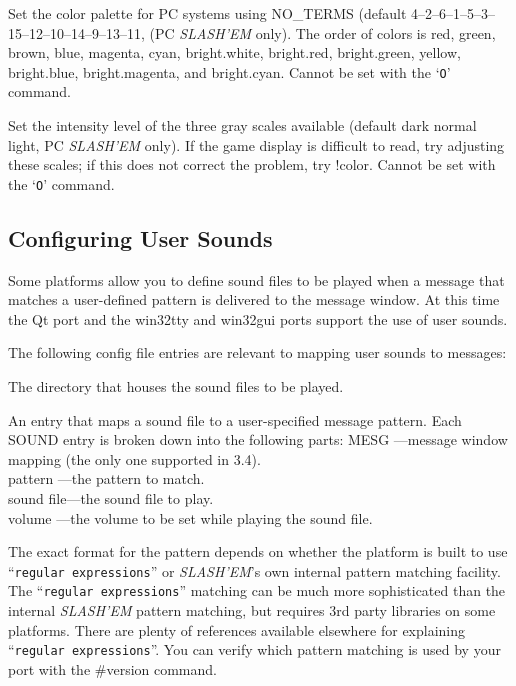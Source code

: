 \item[\ib{videocolors}]
Set the color palette for PC systems using NO\_TERMS
(default 4--2--6--1--5--3--15--12--10--14--9--13--11, (PC {\it SLASH'EM\/} only).
The order of colors is red, green, brown, blue, magenta, cyan,
bright.white, bright.red, bright.green, yellow, bright.blue,
bright.magenta, and bright.cyan.
Cannot be set with the `{\tt O}' command.

\item[\ib{videoshades}]
Set the intensity level of the three gray scales available
(default dark normal light, PC {\it SLASH'EM\/} only).
If the game display is difficult to read, try adjusting these scales;
if this does not correct the problem, try !color.
Cannot be set with the `{\tt O}' command.
\elist
\nd %
\subsection*{Configuring User Sounds}


Some platforms allow you to define sound files to be played when a message 
that matches a user-defined pattern is delivered to the message window.
At this time the Qt port and the win32tty and win32gui ports support the
use of user sounds.

The following config file entries are relevant to mapping user sounds
to messages:
\blist{}

\item[\bb{SOUNDDIR}]
The directory that houses the sound files to be played.

\item[\bb{SOUND}]
An entry that maps a sound file to a user-specified message pattern.
Each SOUND entry is broken down into the following parts:
MESG      ---message window mapping (the only one supported in 3.4).\\
pattern   ---the pattern to match.\\
sound file---the sound file to play.\\
volume    ---the volume to be set while playing the sound file.
\elist
\nd %

The exact format for the pattern depends on whether the platform is
built to use ``{\tt regular expressions}'' or {\it SLASH'EM\/}'s own internal pattern 
matching facility. The ``{\tt regular expressions}'' matching can be much more 
sophisticated than the internal {\it SLASH'EM\/} pattern matching, but requires 
3rd party libraries on some platforms.  There are plenty of references 
available elsewhere for explaining ``{\tt regular expressions}''. You can verify 
which pattern matching is used by your port with the \#version command.  

